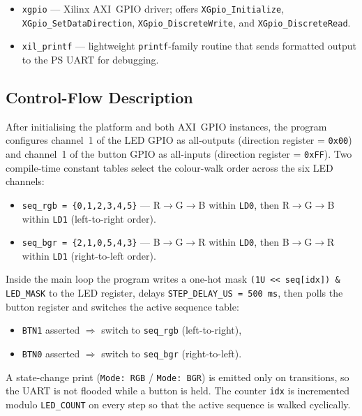 \documentclass[12pt]{article}
\begin{document}
\begin{itemize}[nosep]
  \item \texttt{xgpio} --- Xilinx AXI~GPIO driver; offers
        \texttt{XGpio\_Initialize}, \texttt{XGpio\_SetDataDirection},
        \texttt{XGpio\_DiscreteWrite}, and
        \texttt{XGpio\_DiscreteRead}.
  \item \texttt{xil\_printf} --- lightweight \texttt{printf}-family
        routine that sends formatted output to the PS UART for
        debugging.
\end{itemize}

\subsection{Control-Flow Description}

After initialising the platform and both AXI~GPIO instances, the
program configures channel~1 of the LED GPIO as all-outputs
(direction register = \texttt{0x00}) and channel~1 of the button GPIO
as all-inputs (direction register = \texttt{0xFF}). Two
compile-time constant tables select the colour-walk order across the
six LED channels:

\begin{itemize}[nosep]
  \item \texttt{seq\_rgb = \{0,1,2,3,4,5\}} --- R$\rightarrow$G$\rightarrow$B
        within \texttt{LD0}, then R$\rightarrow$G$\rightarrow$B within
        \texttt{LD1} (left-to-right order).
  \item \texttt{seq\_bgr = \{2,1,0,5,4,3\}} --- B$\rightarrow$G$\rightarrow$R
        within \texttt{LD0}, then B$\rightarrow$G$\rightarrow$R within
        \texttt{LD1} (right-to-left order).
\end{itemize}

\noindent
Inside the main loop the program writes a one-hot mask
\texttt{(1U << seq[idx]) \& LED\_MASK} to the LED register, delays
\texttt{STEP\_DELAY\_US = 500\,ms}, then polls the button register and
switches the active sequence table:

\begin{itemize}[nosep]
  \item \texttt{BTN1} asserted $\Rightarrow$ switch to \texttt{seq\_rgb}
        (left-to-right),
  \item \texttt{BTN0} asserted $\Rightarrow$ switch to \texttt{seq\_bgr}
        (right-to-left).
\end{itemize}

\noindent
A state-change print (\texttt{Mode:\ RGB} / \texttt{Mode:\ BGR}) is
emitted only on transitions, so the UART is not flooded while a button
is held. The counter \texttt{idx} is incremented modulo \texttt{LED\_COUNT}
on every step so that the active sequence is walked cyclically.
\end{document}
